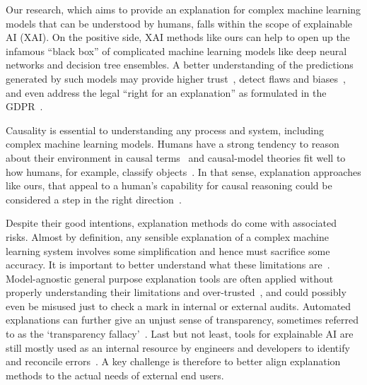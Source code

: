 \documentclass{article}
\begin{document}

Our research, which aims to provide an explanation for complex machine learning models that can be understood by humans, falls within the scope of explainable AI (XAI). On the positive side, XAI methods like ours can help to open up the infamous ``black box'' of complicated machine learning models like deep neural networks and decision tree ensembles. A better understanding of the predictions generated by such models may provide higher trust~\cite{ribeiro2016should}, detect flaws and biases~\cite{kusner2017counterfactual}, and even address the legal ``right for an explanation'' as formulated in the GDPR~\cite{gdpr2017}.

Causality is essential to understanding any process and system, including complex machine learning models. Humans have a strong tendency to reason about their environment in causal terms~\cite{sloman2005causal} and causal-model theories fit well to how humans, for example, classify objects~\cite{rehder2003causal}. In that sense, explanation approaches like ours, that appeal to a human's capability for causal reasoning could be considered a step in the right direction~\cite{mittelstadt2019explaining}.

Despite their good intentions, explanation methods do come with associated risks. Almost by definition, any sensible explanation of a complex machine learning system involves some simplification and hence must sacrifice some accuracy. It is important to better understand what these limitations are~\cite{kumar2020problems}. Model-agnostic general purpose explanation tools are often applied without properly understanding their limitations and over-trusted~\cite{kaur2020interpreting}, and could possibly even be misused just to check a mark in internal or external audits. Automated explanations can further give an unjust sense of transparency, sometimes referred to as the `transparency fallacy'~\cite{edwards2017slave}. Last but not least, tools for explainable AI are still mostly used as an internal resource by engineers and developers to identify and reconcile errors~\cite{bhatt2020explainable}. A key challenge is therefore to better align explanation methods to the actual needs of external end users. 




\end{document}
